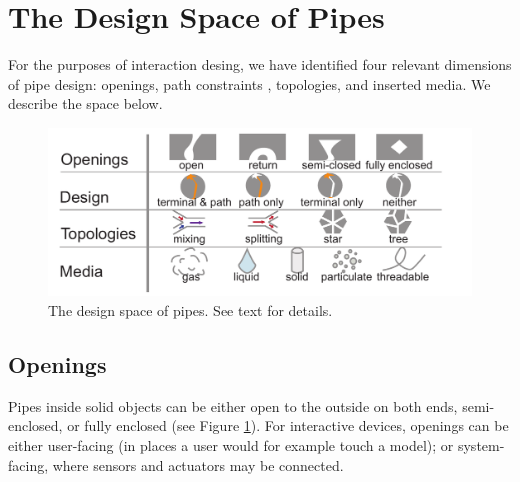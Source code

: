
\section{The Design Space of Pipes}
For the purposes of interaction desing, we have identified four relevant dimensions of pipe design: openings, path constraints , topologies, and inserted media.  We describe the space below.

\begin{figure}[t]
\centering
    \includegraphics[width=1.0\columnwidth]{figures/tubespace.pdf}
\caption{The design space of pipes.  See text for details.}
\label{fig:pipespace}
\end{figure}

\subsection{Openings}
Pipes inside solid objects can be either open to the outside on both ends, semi-enclosed, or fully enclosed (see Figure \ref{fig:pipespace}). For interactive devices, openings can be either user-facing (in places a user would for example touch a model); or system-facing, where sensors and actuators may be connected.

